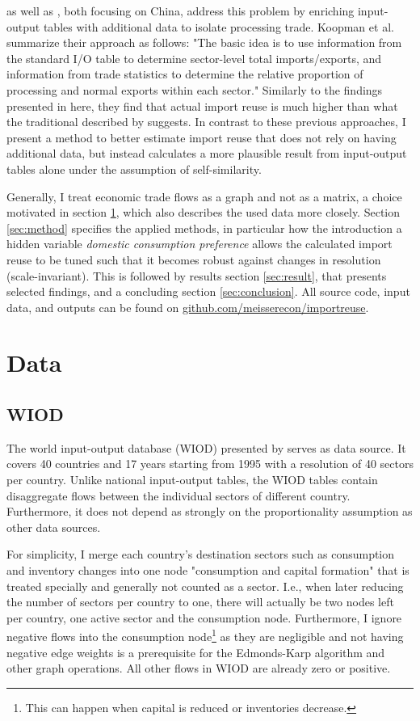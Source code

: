 \documentclass[english]{uzhpub}
\begin{document}
\cite{koopman2012tracing} as well as \cite{kee2013domestic}, both focusing on China, address this problem by enriching input-output tables with additional data to isolate processing trade. Koopman et al. summarize their approach as follows: "The basic idea is to use information from the standard I/O table to determine sector-level total imports/exports, and information from trade statistics to determine the relative proportion of processing and normal exports within each sector." Similarly to the findings presented in here, they find that actual import reuse is much higher than what the traditional described by \cite{hummels2001nature} suggests. In contrast to these previous approaches, I present a method to better estimate import reuse that does not rely on having additional data, but instead calculates a more plausible result from input-output tables alone under the assumption of self-similarity.

Generally, I treat economic trade flows as a graph and not as a matrix, a choice motivated in section \ref{sec:data}, which also describes the used data more closely. Section \ref{sec:method} specifies the applied methods, in particular how the introduction a hidden variable \emph{domestic consumption preference} allows the calculated import reuse to be tuned such that it becomes robust against changes in resolution (scale-invariant). This is followed by results section \ref{sec:result}, that presents selected findings, and a concluding section \ref{sec:conclusion}. All source code, input data, and outputs can be found on \href{https://github.com/meisserecon/importreuse}{github.com/meisserecon/importreuse}.

\section{Data} \label{sec:data}
\subsection{WIOD}
The world input-output database (WIOD) presented by \cite{timmer2012world} serves as data source. It covers 40 countries and 17 years starting from 1995 with a resolution of 40 sectors per country. Unlike national input-output tables, the WIOD tables contain disaggregate flows between the individual sectors of different country. Furthermore, it does not depend as strongly on the proportionality assumption as other data sources.

For simplicity, I merge each country's destination sectors such as consumption and inventory changes into one node "consumption and capital formation" that is treated specially and generally not counted as a sector. I.e., when later reducing the number of sectors per country to one, there will actually be two nodes left per country, one active sector and the consumption node. Furthermore, I ignore negative flows into the consumption node\footnote{This can happen when capital is reduced or inventories decrease.} as they are negligible and not having negative edge weights is a prerequisite for the Edmonds-Karp algorithm \citep{edmonds1972theoretical} and other graph operations. All other flows in WIOD are already zero or positive.
\end{document}

